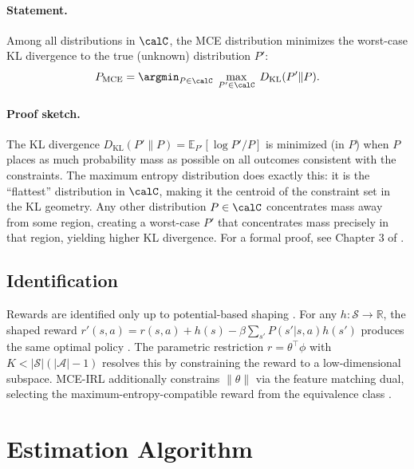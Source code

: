 \documentclass[10pt]{article}
\newcommand{\E}{\mathbb{E}}
\newcommand{\R}{\mathbb{R}}
\newcommand{\calA}{\mathcal{A}}
\newcommand{\calS}{\mathcal{S}}
\begin{document}
\paragraph{Statement.}
Among all distributions in $\calC$, the MCE distribution minimizes the worst-case KL divergence to the true (unknown) distribution $P'$:
\begin{equation}
P_{\text{MCE}} = \argmin_{P \in \calC} \; \max_{P' \in \calC} \; D_{\text{KL}}(P' \| P).
\end{equation}

\paragraph{Proof sketch.}
The KL divergence $D_{\text{KL}}(P' \| P) = \E_{P'}[\log P'/P]$ is minimized (in $P$) when $P$ places as much probability mass as possible on all outcomes consistent with the constraints. The maximum entropy distribution does exactly this: it is the ``flattest'' distribution in $\calC$, making it the centroid of the constraint set in the KL geometry. Any other distribution $P \in \calC$ concentrates mass away from some region, creating a worst-case $P'$ that concentrates mass precisely in that region, yielding higher KL divergence. For a formal proof, see Chapter 3 of \citet{ziebart2010}.

\subsection{Identification}

Rewards are identified only up to potential-based shaping \citep{ng1999}. For any $h: \calS \to \R$, the shaped reward $r'(s,a) = r(s,a) + h(s) - \beta \sum_{s'} P(s'|s,a) h(s')$ produces the same optimal policy \citep{magnacThesmar2002}. The parametric restriction $r = \theta^\top \phi$ with $K < |\calS|(|\calA|-1)$ resolves this by constraining the reward to a low-dimensional subspace. MCE-IRL additionally constrains $\|\theta\|$ via the feature matching dual, selecting the maximum-entropy-compatible reward from the equivalence class \citep{kim2021}.


\section{Estimation Algorithm}
\end{document}
